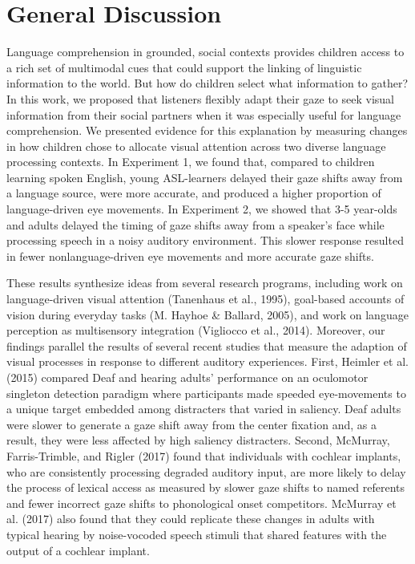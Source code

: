 \documentclass[,man,floatsintext]{apa6}
\begin{document}
\section{General Discussion}\label{general-discussion}

Language comprehension in grounded, social contexts provides children
access to a rich set of multimodal cues that could support the linking
of linguistic information to the world. But how do children select what
information to gather? In this work, we proposed that listeners flexibly
adapt their gaze to seek visual information from their social partners
when it was especially useful for language comprehension. We presented
evidence for this explanation by measuring changes in how children chose
to allocate visual attention across two diverse language processing
contexts. In Experiment 1, we found that, compared to children learning
spoken English, young ASL-learners delayed their gaze shifts away from a
language source, were more accurate, and produced a higher proportion of
language-driven eye movements. In Experiment 2, we showed that 3-5
year-olds and adults delayed the timing of gaze shifts away from a
speaker's face while processing speech in a noisy auditory environment.
This slower response resulted in fewer nonlanguage-driven eye movements
and more accurate gaze shifts.

These results synthesize ideas from several research programs, including
work on language-driven visual attention (Tanenhaus et al., 1995),
goal-based accounts of vision during everyday tasks (M. Hayhoe \&
Ballard, 2005), and work on language perception as multisensory
integration (Vigliocco et al., 2014). Moreover, our findings parallel
the results of several recent studies that measure the adaption of
visual processes in response to different auditory experiences. First,
Heimler et al. (2015) compared Deaf and hearing adults' performance on
an oculomotor singleton detection paradigm where participants made
speeded eye-movements to a unique target embedded among distracters that
varied in saliency. Deaf adults were slower to generate a gaze shift
away from the center fixation and, as a result, they were less affected
by high saliency distracters. Second, McMurray, Farris-Trimble, and
Rigler (2017) found that individuals with cochlear implants, who are
consistently processing degraded auditory input, are more likely to
delay the process of lexical access as measured by slower gaze shifts to
named referents and fewer incorrect gaze shifts to phonological onset
competitors. McMurray et al. (2017) also found that they could replicate
these changes in adults with typical hearing by noise-vocoded speech
stimuli that shared features with the output of a cochlear implant.
\end{document}
